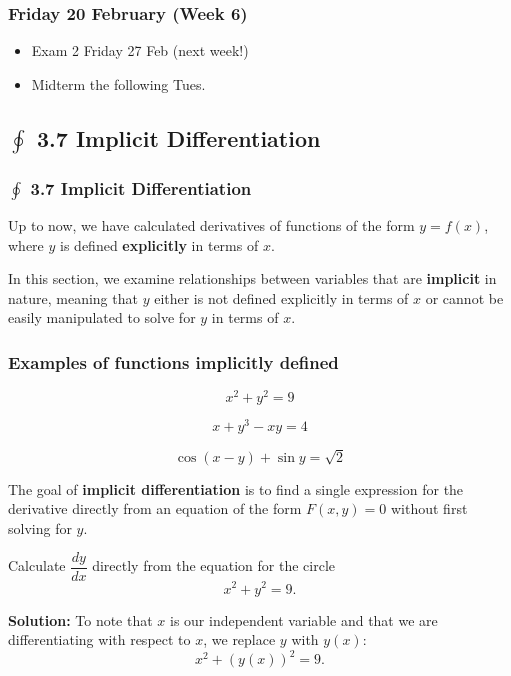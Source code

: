 \documentclass[14pt]{beamer}
\begin{document}

\begin{frame}
\frametitle{Friday 20 February (Week 6)}
\begin{itemize}
\item Exam 2 Friday 27 Feb (next week!)
\item Midterm the following Tues.
\end{itemize}
\end{frame}

\begin{frame}
\subsection[3.7 Implicit Differentiation]{$\oint$ 3.7 Implicit Differentiation}
\frametitle{$\oint$ 3.7 Implicit Differentiation}
\small
Up to now, we have calculated derivatives of functions of the form $y=f(x)$, where $y$ is defined {\bf explicitly} in terms of $x$.

\bigskip

In this section, we examine relationships between variables that are {\bf implicit} in nature, meaning that $y$ either is not defined explicitly in terms of $x$ or cannot be easily manipulated to solve for $y$ in terms of $x$.
\end{frame}

\begin{frame}
\frametitle{Examples of functions implicitly defined}
$$x^2 + y^2 = 9$$

\bigskip

$$x+y^3-xy=4$$

\bigskip

$$\cos(x-y)+\sin y = \sqrt{2}$$
\end{frame}

\begin{frame}

The goal of {\bf implicit differentiation} is to find a single expression for the derivative directly from an equation of the form $F(x,y)=0$ without first solving for $y$.
\end{frame}

\begin{frame}

Calculate $\dfrac{dy}{dx}$ directly from the equation for the circle 
$$x^2 + y^2 = 9.$$

\bigskip

{\bf Solution:}  To note that $x$ is our independent variable and that we are differentiating with respect to $x$, we replace $y$ with $y(x)$:
$$x^2 + (y(x))^2 = 9.$$
\end{frame}
\end{document}
